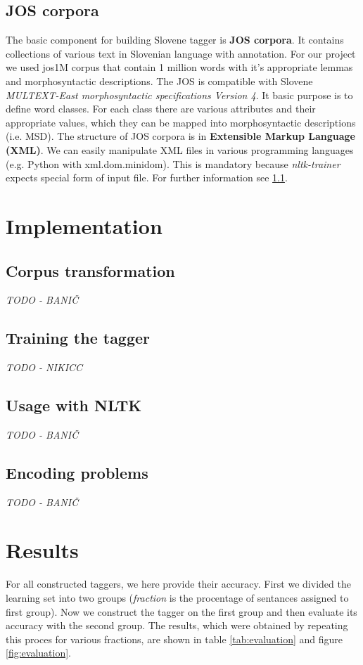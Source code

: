 \documentclass[10pt, conference, compsocconf]{IEEEtran}
\begin{document}
\subsection{JOS corpora} %
The basic component for building Slovene tagger is \textbf{JOS corpora}.
It contains collections of various text in Slovenian language with annotation.
For our project we used jos1M corpus that contain 1 million words with it's appropriate lemmas and morphosyntactic descriptions.
The JOS is compatible with Slovene\textit{ MULTEXT-East morphosyntactic specifications Version 4}\cite{MULTEXT-East}.
It basic purpose is to define word classes.
For each class there are various attributes and their appropriate values, which they can be mapped into morphosyntactic descriptions (i.e. MSD).
The structure of JOS corpora is in  \textbf{Extensible Markup Language (XML)}.
We can easily manipulate XML files in various programming languages (e.g. Python with xml.dom.minidom).
This is mandatory because \textit{nltk-trainer}\cite{nltk-trainer} expects special form of input file.
For further information see \ref{Corpus transformation}.

\section{Implementation}
\subsection{Corpus transformation} %
\label{Corpus transformation} 
\textit{TODO - BANIČ}
\subsection{Training the tagger} %
\textit{TODO - NIKICC}
\subsection{Usage with NLTK} %
\textit{TODO - BANIČ}
\subsection{Encoding problems} %
\textit{TODO - BANIČ}

\section{Results} %
\label{results}
For all constructed taggers, we here provide their accuracy. First we divided the learning set into two groups (\textit{fraction} is the procentage of sentances assigned to first group).
Now we construct the tagger on the first group and then evaluate its accuracy with the second group. The results, which were obtained by repeating this proces for various fractions, are shown in table \ref{tab:evaluation} and figure \ref{fig:evaluation}.
\end{document}
